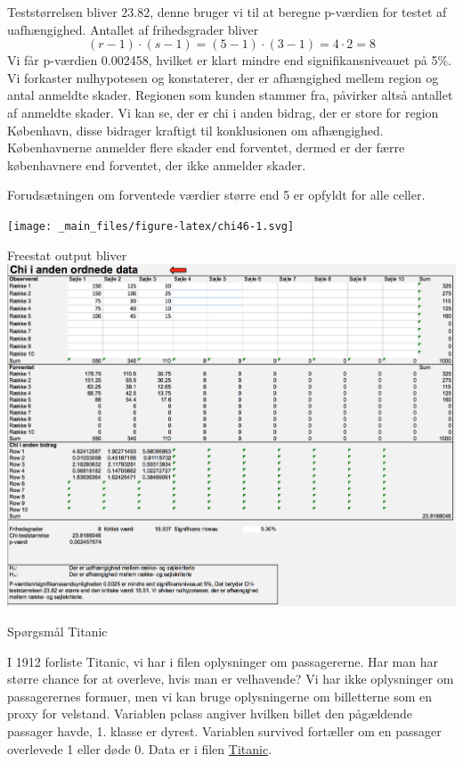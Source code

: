 \documentclass[]{book}
\begin{document}
Teststørrelsen bliver 23.82, denne bruger vi til at beregne p-værdien for testet af uafhængighed. Antallet af frihedsgrader bliver
\[(r-1)\cdot(s-1)=(5-1)\cdot(3-1)=4\cdot 2=8\]
Vi får p-værdien 0.002458, hvilket er klart mindre end signifikansniveauet på 5\%. Vi forkaster nulhypotesen og konstaterer, der er afhængighed mellem region og antal anmeldte skader. Regionen som kunden stammer fra, påvirker altså antallet af anmeldte skader. Vi kan se, der er chi i anden bidrag, der er store for region København, disse bidrager kraftigt til konklusionen om afhængighed. Københavnerne anmelder flere skader end forventet, dermed er der færre københavnere end forventet, der ikke anmelder skader.

Forudsætningen om forventede værdier større end 5 er opfyldt for alle celler.

\texttt{[image: \_main\_files/figure-latex/chi46-1.svg]}

Freestat output bliver
\includegraphics{img/chiskade2.png}

Spørgsmål Titanic

I 1912 forliste Titanic, vi har i filen oplysninger om passagererne. Har man har større chance for at overleve, hvis man er velhavende? Vi har ikke oplysninger om passagerernes formuer, men vi kan bruge oplysningerne om billetterne som en proxy for velstand. Variablen pclass angiver hvilken billet den pågældende passager havde, 1. klasse er dyrest. Variablen survived fortæller om en passager overlevede 1 eller døde 0. Data er i filen \href{https://drive.google.com/uc?export=download\&id=0B1E7VnhxsDMlYWJOOG5yamNoOTQ}{Titanic}.
\end{document}
